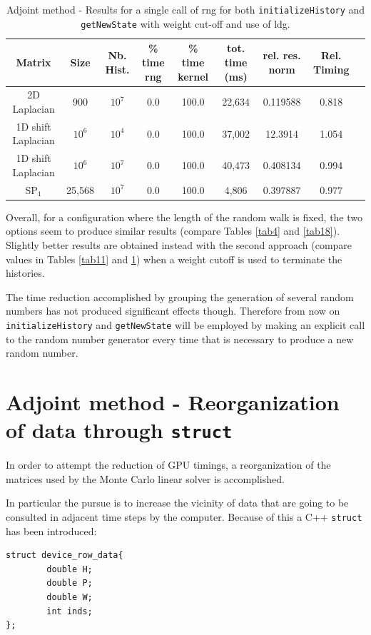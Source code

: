 \documentclass[a4paper,10pt]{article}
\begin{document}
\begin{table}[!h]
\hspace*{-2.5cm}
\begin{tabular}{|c|c|c|c|c|c|c|c|c|}
\hline
\textbf{Matrix} & \textbf{Size} &\textbf{Nb. Hist.} & \textbf{\% time rng} 
& \textbf{\% time kernel} & tot. time (ms)& rel. res. norm & Rel. Timing\\
\hline
2D Laplacian& 900 & $10^7$ & 0.0 & 100.0 & 22,634 & 0.119588 & 0.818\\
\hline 
1D shift Laplacian& $10^6$ & $10^4$ & 0.0 & 100.0 & 37,002 & 12.3914 & 1.054\\
\hline
1D shift Laplacian& $10^6$ & $10^7$ & 0.0 & 100.0 & 40,473 & 0.408134 & 0.994\\
\hline
$\text{SP}_1$ & 25,568 & $10^7$ & 0.0 & 100.0 & 4,806 & 0.397887 & 0.977\\
\hline
\end{tabular}
\caption{Adjoint method - Results for a single call of rng for both 
\texttt{initializeHistory} 
and \texttt{getNewState} with weight cut-off and use of ldg.} 
\label{tab19}
\end{table}

Overall, for a configuration where the length of the random walk is fixed, the 
two options seem to produce similar results (compare Tables \ref{tab4} 
and \ref{tab18}). Slightly better results are obtained instead with the second 
approach (compare values in Tables \ref{tab11} and \ref{tab19}) when a weight 
cutoff is used to terminate the histories. 

The time reduction accomplished by grouping the generation of several random 
numbers has not produced significant effects though. Therefore
from now on \texttt{initializeHistory} and \texttt{getNewState} will be 
employed by making an explicit call to the random number generator every time 
that is 
necessary to produce a new random number. 


\section{Adjoint method - Reorganization of data through \texttt{struct}}

In order to attempt the reduction of GPU timings, a 
reorganization of the matrices used by the Monte Carlo 
linear solver is accomplished.

In particular the pursue is to increase the vicinity of data that are going to 
be consulted in adjacent time steps by the computer.
Because of this a C++ \texttt{struct} has been introduced:
\hspace*{-2cm}
\begin{lstlisting}
struct device_row_data{
        double H;
        double P;
        double W;
        int inds;
};
\end{lstlisting}
\end{document}
